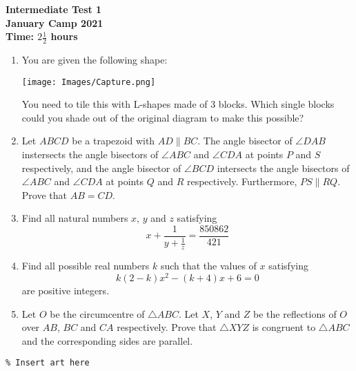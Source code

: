 \documentclass{article}
\begin{document}
\thispagestyle{empty}

\begin{center}
  \textbf{\Large Intermediate Test 1}
  \\ \vspace{1em}
  \textbf{\large January Camp 2021}
  \\ \vspace{1em}
  \textbf{\large Time: $2\frac{1}{2}$ hours}
\end{center}

\vspace{24pt}

\begin{enumerate}[1.]

\item You are given the following shape: %
	\begin{center}
	\texttt{[image: Images/Capture.png]}	
	\end{center}
You need to tile this with L-shapes made of 3 blocks. Which single blocks could you shade out of the original diagram to make this possible?


\item %
Let $ABCD$ be a trapezoid with $AD \parallel BC$. The angle bisector of $\angle DAB$ instersects the angle bisectors of $\angle ABC$ and $\angle CDA$ at points $P$ and $S$ respectively, and the angle bisector of $\angle BCD$ intersects the angle bisectors of $\angle ABC$ and $\angle CDA$ at points $Q$ and $R$ respectively. Furthermore, $PS \parallel RQ$. Prove that $AB = CD$.


\item %
Find all natural numbers $x$, $y$ and $z$ satisfying 
$$x + \frac{1}{y + \frac{1}{z}} = \frac{850862}{421}$$


\item %
Find all possible real numbers $k$ such that the values of $x$ satisfying
$$k(2 - k)x^2 - (k + 4)x + 6 = 0$$
are positive integers.


\item %
Let $O$ be the circumcentre of $\triangle ABC$. Let $X$, $Y$ and $Z$ be the reflections of $O$ over $AB$, $BC$ and $CA$ respectively. Prove that $\triangle XYZ$ is congruent to $\triangle ABC$ and the corresponding sides are parallel.



\end{enumerate}


\vfill
\begin{center} \begin{verbatim}
% Insert art here
\end{verbatim} \end{center}
\end{document}
